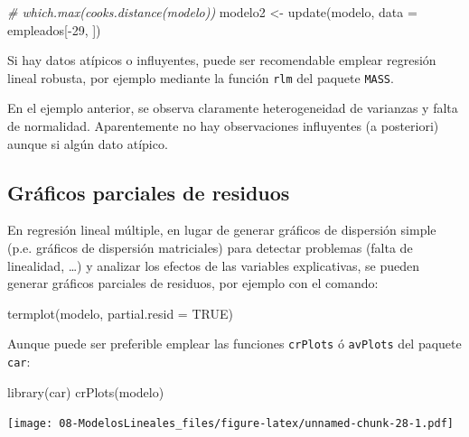 \documentclass[
]{book}
\newenvironment{Shaded}{\begin{snugshade}}{\end{snugshade}}
\newcommand{\AttributeTok}[1]{\textcolor[rgb]{0.77,0.63,0.00}{#1}}
\newcommand{\CommentTok}[1]{\textcolor[rgb]{0.56,0.35,0.01}{\textit{#1}}}
\newcommand{\ConstantTok}[1]{\textcolor[rgb]{0.00,0.00,0.00}{#1}}
\newcommand{\DecValTok}[1]{\textcolor[rgb]{0.00,0.00,0.81}{#1}}
\newcommand{\FunctionTok}[1]{\textcolor[rgb]{0.00,0.00,0.00}{#1}}
\newcommand{\NormalTok}[1]{#1}
\newcommand{\OtherTok}[1]{\textcolor[rgb]{0.56,0.35,0.01}{#1}}
\newcommand{\SpecialCharTok}[1]{\textcolor[rgb]{0.00,0.00,0.00}{#1}}
\theoremstyle{break}
\theoremstyle{nonumberplain}
\begin{document}
\begin{Shaded}
\begin{Highlighting}[]
\CommentTok{\# which.max(cooks.distance(modelo))}
\NormalTok{modelo2 }\OtherTok{\textless{}{-}} \FunctionTok{update}\NormalTok{(modelo, }\AttributeTok{data =}\NormalTok{ empleados[}\SpecialCharTok{{-}}\DecValTok{29}\NormalTok{, ])}
\end{Highlighting}
\end{Shaded}

Si hay datos atípicos o influyentes, puede ser recomendable emplear regresión lineal robusta, por ejemplo mediante la función \texttt{rlm} del paquete \texttt{MASS}.

En el ejemplo anterior, se observa claramente heterogeneidad de varianzas y falta de normalidad. Aparentemente no hay observaciones influyentes (a posteriori) aunque si algún dato atípico.

\hypertarget{gruxe1ficos-parciales-de-residuos}{%
\subsection{Gráficos parciales de residuos}\label{gruxe1ficos-parciales-de-residuos}}

En regresión lineal múltiple, en lugar de generar gráficos de dispersión simple
(p.e. gráficos de dispersión matriciales) para detectar problemas (falta de
linealidad, \ldots) y analizar los efectos de las variables explicativas,
se pueden generar gráficos parciales de residuos, por ejemplo con el comando:

\begin{Shaded}
\begin{Highlighting}[]
\FunctionTok{termplot}\NormalTok{(modelo, }\AttributeTok{partial.resid =} \ConstantTok{TRUE}\NormalTok{)}
\end{Highlighting}
\end{Shaded}

Aunque puede ser preferible emplear las funciones \texttt{crPlots} ó \texttt{avPlots} del paquete \texttt{car}:

\begin{Shaded}
\begin{Highlighting}[]
\FunctionTok{library}\NormalTok{(car)}
\FunctionTok{crPlots}\NormalTok{(modelo)}
\end{Highlighting}
\end{Shaded}

\texttt{[image: 08-ModelosLineales\_files/figure-latex/unnamed-chunk-28-1.pdf]}
\end{document}
